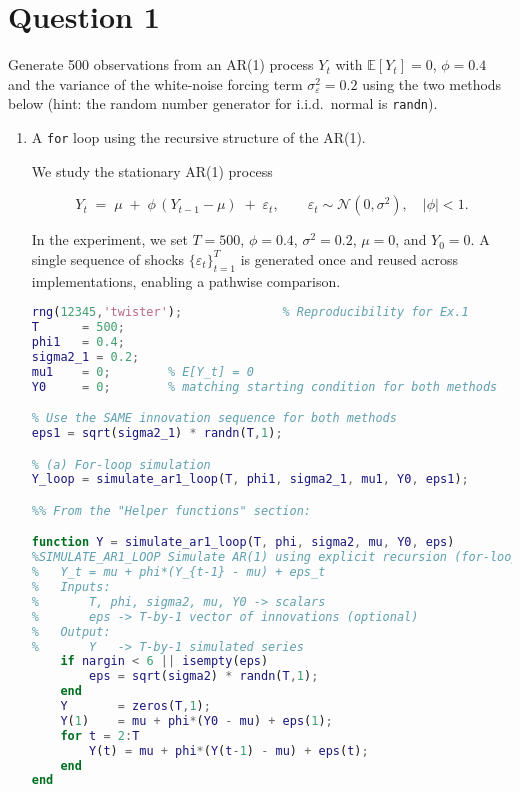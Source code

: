 \documentclass[dvipsnames,11pt]{article}
\begin{document}
\section*{Question 1}
\setcounter{section}{1}

    Generate 500 observations from an AR(1) process $Y_t$ with $\mathbb{E}[Y_t]=0$, $\phi=0.4$ and the variance of the white-noise forcing term $\sigma_\varepsilon^2=0.2$ using the two methods below (hint: the random number generator for i.i.d.\ normal is \texttt{randn}).

    \begin{enumerate}[label=\alph*.]
        \item A \texttt{for} loop using the recursive structure of the AR(1).
        
            \begin{solution}

                We study the stationary AR(1) process
                
                \begin{equation}
                  Y_t \;=\; \mu \;+\; \phi\,(Y_{t-1}-\mu) \;+\; \varepsilon_t,
                  \qquad \varepsilon_t \sim \mathcal{N}(0,\sigma^2),\quad |\phi|<1.
                \end{equation}
                
                In the experiment, we set $T=500$, $\phi=0.4$, $\sigma^2=0.2$, $\mu=0$, and $Y_0=0$.
                A single sequence of shocks $\{\varepsilon_t\}_{t=1}^T$ is generated once and reused across implementations, enabling a pathwise comparison.

\begin{lstlisting}[language=Matlab]
rng(12345,'twister');              % Reproducibility for Ex.1
T      = 500;
phi1   = 0.4;
sigma2_1 = 0.2;
mu1    = 0;        % E[Y_t] = 0
Y0     = 0;        % matching starting condition for both methods

% Use the SAME innovation sequence for both methods
eps1 = sqrt(sigma2_1) * randn(T,1);

% (a) For-loop simulation
Y_loop = simulate_ar1_loop(T, phi1, sigma2_1, mu1, Y0, eps1);

%% From the "Helper functions" section:

function Y = simulate_ar1_loop(T, phi, sigma2, mu, Y0, eps)
%SIMULATE_AR1_LOOP Simulate AR(1) using explicit recursion (for-loop).
%   Y_t = mu + phi*(Y_{t-1} - mu) + eps_t
%   Inputs:
%       T, phi, sigma2, mu, Y0 -> scalars
%       eps -> T-by-1 vector of innovations (optional)
%   Output:
%       Y   -> T-by-1 simulated series
    if nargin < 6 || isempty(eps)
        eps = sqrt(sigma2) * randn(T,1);
    end
    Y       = zeros(T,1);
    Y(1)    = mu + phi*(Y0 - mu) + eps(1);
    for t = 2:T
        Y(t) = mu + phi*(Y(t-1) - mu) + eps(t);
    end
end
\end{lstlisting}


\end{solution}
\end{enumerate}
\end{document}
